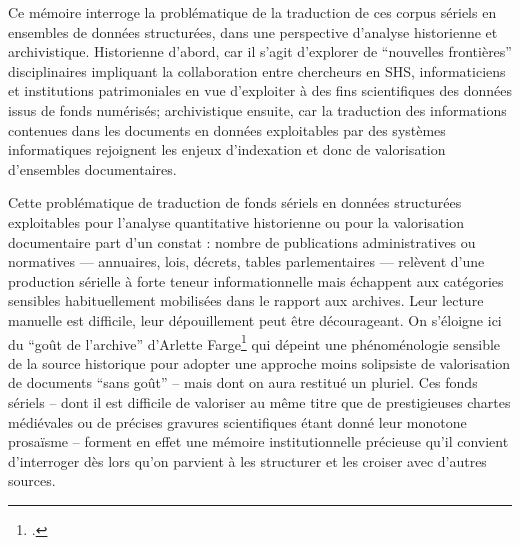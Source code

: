 Ce mémoire interroge la problématique de la traduction de ces corpus sériels en ensembles de données structurées, dans une perspective d’analyse historienne et archivistique. 
Historienne d'abord, car il s'agit d'explorer de \enquote{nouvelles frontières} disciplinaires impliquant la collaboration entre chercheurs en SHS, informaticiens et institutions patrimoniales en vue d'exploiter à des fins scientifiques des données issus de fonds numérisés; archivistique ensuite, car la traduction des informations contenues dans les documents en données exploitables par des systèmes informatiques rejoignent les enjeux d'indexation et donc de valorisation d'ensembles documentaires.

Cette problématique de traduction de fonds sériels en données structurées exploitables pour l'analyse quantitative historienne ou pour la valorisation documentaire part d’un constat : nombre de publications administratives ou normatives — annuaires, lois, décrets, tables parlementaires — relèvent d’une production sérielle à forte teneur informationnelle mais échappent aux catégories sensibles habituellement mobilisées dans le rapport aux archives. Leur lecture manuelle est difficile, leur dépouillement peut être décourageant. On s'éloigne ici du \enquote{goût de l'archive} d'Arlette Farge\footcite{farge} qui dépeint une phénoménologie sensible de la source historique pour adopter une approche moins solipsiste de valorisation de documents \enquote{sans goût} -- mais dont on aura restitué un pluriel. Ces fonds sériels -- dont il est difficile de valoriser au même titre que de prestigieuses chartes médiévales ou de précises gravures scientifiques étant donné leur monotone prosaïsme -- forment en effet une mémoire institutionnelle précieuse qu'il convient d'interroger dès lors qu’on parvient à les structurer et les croiser avec d’autres sources.

